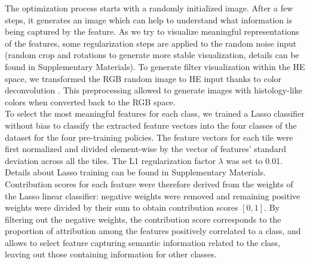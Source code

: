 The optimization process starts with a randomly initialized image. After a few steps, it generates an image which can help to understand what information is being captured by the feature. 
As we try to visualize meaningful representations of the features, some regularization steps are applied to the random noise input (random crop and rotations to generate more stable visualization, details can be found in Supplementary Materials). To generate filter visualization within  the HE space, we transformed the RGB random image to HE input thanks to color deconvolution \citep{ruifrok_quantification_2001}. This preprocessing allowed to generate images with histology-like colors when converted back to the RGB space. \\
To select the most meaningful features for each class, we trained a Lasso classifier without bias to classify the extracted feature vectors into the four classes of the dataset for the four pre-training policies. The feature vectors for each tile were first normalized and divided element-wise by the vector of features’ standard deviation across all the tiles.  The L1 regularization factor  $\lambda$ was set to 0.01. Details about Lasso training can be found in Supplementary Materials. Contribution scores for each feature were therefore derived from the weights of the Lasso linear classifier: negative weights were removed and remaining positive weights were divided by their sum to obtain contribution scores $[0, 1]$. By filtering out the negative weights, the contribution score corresponds to the proportion of attribution among the features positively correlated to a class, and allows to select feature capturing semantic information related to the class, leaving out  those containing information for other classes.


